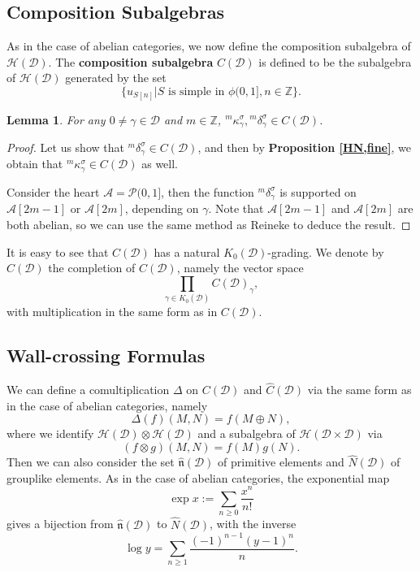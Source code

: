 \documentclass[a4paper,12pt]{amsart}
\newtheorem{lemma}[theorem]{Lemma}
\begin{document}
\subsection{Composition Subalgebras}
As in the case of abelian categories, we now define the composition subalgebra of $\mathcal{H}(\mathcal{D})$. The \textbf{composition subalgebra} $C(\mathcal{D})$ is defined to be the subalgebra of $\mathcal{H}(\mathcal{D})$ generated by the set
\[\{u_{S[n]}|S \text{ is simple in } \phi(0,1], n\in\mathbb{Z}\}.\]
\begin{lemma}
    For any $0\neq\gamma\in\mathcal{D}$ and $m\in\mathbb{Z}$, ${^m}\kappa^\sigma_\gamma,{^m}\delta^\sigma_\gamma\in C(\mathcal{D})$.
\end{lemma}
\begin{proof}
    Let us show that ${^m}\delta^\sigma_\gamma\in C(\mathcal{D})$, and then by \textbf{Proposition \ref{HN,fine}}, we obtain that ${^m}\kappa^\sigma_\gamma\in C(\mathcal{D})$ as well.

    Consider the heart $\mathcal{A}=\mathcal{P}(0,1]$, then the function ${^m}\delta^\sigma_\gamma$ is supported on $\mathcal{A}[2m-1]$ or $\mathcal{A}[2m]$, depending on $\gamma$. Note that $\mathcal{A}[2m-1]$ and $\mathcal{A}[2m]$ are both abelian, so we can use the same method as Reineke \cite[Lemma 4.4]{Rei2002} to deduce the result.
\end{proof}
It is easy to see that $C(\mathcal{D})$ has a natural $K_0(\mathcal{D})$-grading. We denote by $\hat{C}(\mathcal{D})$ the completion of $C(\mathcal{D})$, namely the vector space
\[\prod_{\gamma\in K_0(\mathcal{D})}C(\mathcal{D})_\gamma,\]
with multiplication in the same form as in $C(\mathcal{D})$.

\subsection{Wall-crossing Formulas}
 We can define a comultiplication $\Delta$ on $C(\mathcal{D})$ and $\hat{C}(\mathcal{D})$ via the same form as in the case of abelian categories, namely
 \[\Delta(f)(M,N)=f(M\oplus N),\]
 where we identify $\mathcal{H}(\mathcal{D})\otimes\mathcal{H}(\mathcal{D})$ and a subalgebra of $\mathcal{H}(\mathcal{D}\times\mathcal{D})$ via
 \[(f\otimes g)(M,N)=f(M)g(N).\]
Then we can also consider the set $\hat{\mathfrak{n}}(\mathcal{D})$ of primitive elements and $\hat{N}(\mathcal{D})$ of grouplike elements. As in the case of abelian categories, the exponential map
\[\exp x:=\sum_{n\geqslant0}\frac{x^n}{n!}\]
gives a bijection from $\hat{\mathfrak{n}}(\mathcal{D})$ to $\hat{N}(\mathcal{D})$, with  the inverse
\[\log y=\sum_{n\geqslant1}\frac{(-1)^{n-1}(y-1)^n}{n}.\]
\end{document}

